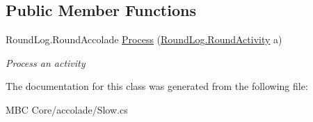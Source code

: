 \subsection*{Public Member Functions}
\begin{DoxyCompactItemize}
\item 
\hypertarget{class_m_b_c_1_1_core_1_1mbc_1_1accolade_1_1_slow_a5849f255e32663d6f88d804bffc7b1fb}{Round\-Log.\-Round\-Accolade \hyperlink{class_m_b_c_1_1_core_1_1mbc_1_1accolade_1_1_slow_a5849f255e32663d6f88d804bffc7b1fb}{Process} (\hyperlink{class_m_b_c_1_1_core_1_1_round_log_1_1_round_activity}{Round\-Log.\-Round\-Activity} a)}\label{class_m_b_c_1_1_core_1_1mbc_1_1accolade_1_1_slow_a5849f255e32663d6f88d804bffc7b1fb}

\begin{DoxyCompactList}\small\item\em Process an activity\end{DoxyCompactList}\end{DoxyCompactItemize}


The documentation for this class was generated from the following file\-:\begin{DoxyCompactItemize}
\item 
M\-B\-C Core/accolade/Slow.\-cs\end{DoxyCompactItemize}

